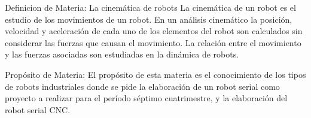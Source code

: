 \documentclass[10pt,stdletter,dateno,sigleft]{newlfm}
\date\\[08 de Octubre del 2019] %
\begin{document}
\date{FECHA 2019}
\begin{newlfm}



Definicion de Materia: La cinemática de robots La cinemática de un robot es el estudio de los movimientos de un robot. En un análisis cinemático la posición, velocidad y aceleración de cada uno de los elementos del robot son calculados sin considerar las fuerzas que causan el movimiento. La relación entre el movimiento y las fuerzas asociadas son estudiadas en la dinámica de robots.

Propósito de Materia: El propósito de esta materia es el conocimiento de los tipos de robots industriales donde se pide la elaboración de un robot serial como proyecto a realizar para el período séptimo cuatrimestre, y la elaboración del robot serial CNC. 
 

\end{newlfm}
\end{document}
